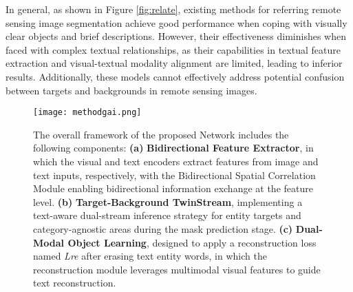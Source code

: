 In general, as shown in Figure \ref{fig:relate}, existing methods for referring remote sensing image segmentation achieve good performance when coping with visually clear objects and brief descriptions. However, their effectiveness diminishes when faced with complex textual relationships, as their capabilities in textual feature extraction and visual-textual modality alignment are limited, leading to inferior results. Additionally, these models cannot effectively address potential confusion between targets and backgrounds in remote sensing images.
\begin{figure*}[!t]
    \centering
    \texttt{[image: methodgai.png]}
    \vspace{-6mm}
    \caption{The overall framework of the proposed \ours Network includes the following components: \textbf{(a)} \textbf{Bidirectional Feature Extractor}, in which the visual and text encoders extract features from image and text inputs, respectively, with the Bidirectional Spatial Correlation Module enabling bidirectional information exchange at the feature level. \textbf{(b)} \textbf{Target-Background TwinStream}, implementing a text-aware dual-stream inference strategy for entity targets and category-agnostic areas during the mask prediction stage. \textbf{(c)} \textbf{Dual-Modal Object Learning}, designed to apply a reconstruction loss named \textit{Lre} after erasing text entity words, in which the reconstruction module leverages multimodal visual features to guide text reconstruction.}
    \vspace{-3mm}
    \label{fig:method}
\end{figure*}